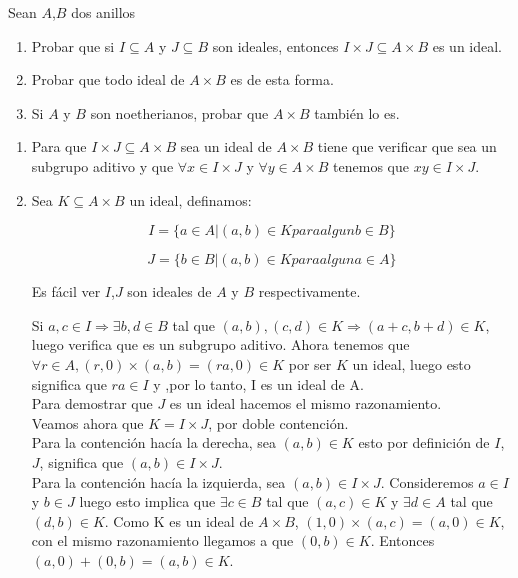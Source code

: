 %
\begin{isabellebody}%
%
%
\isadelimtheory
%
\endisadelimtheory
%
\isatagtheory
%
\endisatagtheory
{\isafoldtheory}%
%
\isadelimtheory
%
\endisadelimtheory
%
\isadelimdocument
%
\endisadelimdocument
%
\isatagdocument
%
\isamarkuptrue%
%
\endisatagdocument
{\isafolddocument}%
%
\isadelimdocument
%
\endisadelimdocument
%
\begin{isamarkuptext}%
\begin {ejercicio} 
Sean $A$,$B$ dos anillos 
\begin {enumerate}
\item Probar que si $I \subseteq A$ y $J \subseteq B$ son ideales,
 entonces $I \times J \subseteq A \times B$ es un ideal.
\item Probar que todo ideal de $A \times B$ es de esta forma.
\item Si $A$ y $B$ son noetherianos, probar que $A \times B$ también lo
 es.
\end{enumerate}

\end {ejercicio} 

\begin {solucion}

\begin{enumerate}

\item Para que $I \times J \subseteq A \times B$ sea un ideal de $A \times B$
 tiene que verificar que sea un subgrupo aditivo y que $\forall  x \in
 I \times J$ y $\forall y \in A \times B$ tenemos que $xy \in I
 \times J$.
\item Sea $K \subseteq A \times B$ un ideal, definamos: 

$$I = \{ a \in A | (a,b) \in K para algun  b \in B \}$$

$$J = \{ b \in B | (a,b) \in K para algun a \in A \}$$

Es fácil ver $I$,$J$ son ideales de $A$ y $B$ respectivamente.

Si $a , c \in I \Longrightarrow \exists b , d \in B$ tal que 
 $(a,b),(c,d) \in K \Longrightarrow (a + c, b + d) \in K$, luego
 verifica que es un subgrupo aditivo. Ahora tenemos que $\forall r \in
A,  (r,0) \times (a,b) = (ra , 0) \in K$ por ser $K$ un ideal, luego esto
significa que $ra \in I$ y ,por lo tanto, I es un ideal de A. \\
Para demostrar que $J$ es un ideal hacemos el mismo razonamiento. \\
Veamos ahora que $K = I \times J$, por doble contención. \\
Para la contención hacía la derecha, sea $(a,b) \in K$ esto por
 definición de $I$,$J$, significa que $(a,b) \in I \times J$. \\
Para la contención hacía la izquierda, sea $(a,b) \in I \times J$.
 Consideremos $a \in I$ y $b \in J$ luego  esto implica que $\exists c
 \in B$ tal que $(a,c) \in K$ y $\exists d \in A$ tal que $(d,b) \in
 K$. Como K es un ideal de $A \times B$, $(1,0) \times (a,c) = (a,0) \in
K$, con el mismo razonamiento llegamos a que $(0,b) \in K$. Entonces 
$(a,0) + (0,b) = (a,b) \in K$. 


\end{enumerate}
\end{solucion}
\end{isamarkuptext}
\end{isabellebody}
